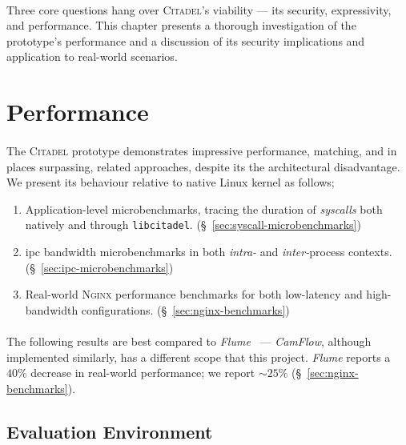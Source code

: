 \paragraph{} Three core questions hang over \textsc{Citadel}'s viability --- its security, expressivity, and performance. This chapter presents a thorough investigation of the prototype's performance and a discussion of its security implications and application to real-world scenarios.

\section{Performance}
\label{sec:performance}

\paragraph{} The \textsc{Citadel} prototype demonstrates impressive performance, matching, and in places surpassing, related approaches, despite its the architectural disadvantage. We present its behaviour relative to native Linux kernel as follows;

\begin{enumerate}
    \item Application-level microbenchmarks, tracing the duration of \textit{syscalls} both natively and through \texttt{libcitadel}. (§~\ref{sec:syscall-microbenchmarks})
    \item \acrshort{ipc} bandwidth microbenchmarks in both \textit{intra-} and \textit{inter-}process contexts. (§~\ref{sec:ipc-microbenchmarks})
    \item Real-world \textsc{Nginx} performance benchmarks for both low-latency and high-bandwidth configurations. (§~\ref{sec:nginx-benchmarks})
\end{enumerate}

\paragraph{} The following results are best compared to \textit{Flume}~\cite{flume} --- \textit{CamFlow}, although implemented similarly, has a different scope that this project. \textit{Flume} reports a $40\%$ decrease in real-world performance; we report $\sim 25\%$ (§~\ref{sec:nginx-benchmarks}).

\subsection{Evaluation Environment}
